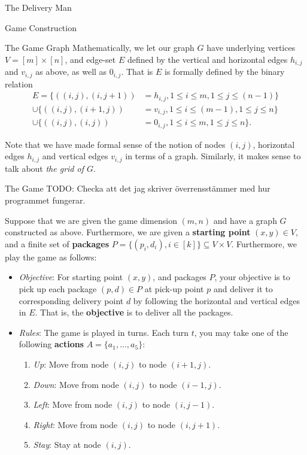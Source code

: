 \begin{section}{The Delivery Man}
\begin{subsection}{Game Construction}
\begin{subsubsection}{The Game Graph}
    Mathematically, we let our graph $G$ have underlying vertices $V = [m] \times [n]$, and edge-set $E$ defined by the vertical and horizontal edges $h_{i,j}$ and $v_{i,j}$ as above, as well as $0_{i,j}$. That is $E$ is formally defined by the binary relation
    \begin{equation}
      \begin{split}
      E = \{((i, j), (i, j+1)) &= h_{i,j}, 1 \leq i \leq m, 1 \leq j \leq (n-1)\}
      \\ \cup \{((i, j), (i+1, j)) &= v_{i,j}, 1 \leq i \leq (m-1), 1 \leq j \leq n \}
      \\ \cup \{((i, j), (i, j)) &= 0_{i,j}, 1 \leq i \leq m, 1 \leq j \leq n \}.
      \end{split}
    \end{equation}

    Note that we have made formal sense of the notion of nodes $(i, j)$, horizontal edges $h_{i,j}$ and vertical edges $v_{i,j}$ in terms of a graph. Similarly, it makes sense to talk about \textit{the grid of $G$}.

    \end{subsubsection}
    
    \begin{subsubsection}{The Game}
      TODO: Checka att det jag skriver överrensstämmer med hur programmet fungerar.

       Suppose that we are given the game dimension $(m, n)$ and have a graph $G$ constructed as above. Furthermore, we are given a \textbf{starting point} $(x, y)\in V$, and a finite set of \textbf{packages} $P = \{(p_i, d_i), i \in [k]\} \subseteq V\times V$. Furthermore, we play the game as follows:
      \begin{itemize}

        \item \textit{Objective}: For starting point $(x,y)$, and packages $P$, your objective is to pick up each package $(p,d)\in P$ at pick-up point $p$ and deliver it to corresponding delivery point $d$ by following the horizontal and vertical edges in $E$. That is, the \textbf{objective} is to deliver all the packages.

        \item \textit{Rules}:
          The game is played in turns. Each turn $t$, you may take one of the following \textbf{actions} $A = \{a_1, ..., a_5 \}$:
          \begin{enumerate}
          \item \textit{Up}: Move from node $(i, j)$ to node $(i+1, j)$.
          \item \textit{Down}: Move from node $(i, j)$ to node $(i-1, j)$.
          \item \textit{Left}: Move from node $(i, j)$ to node $(i, j-1)$.
          \item \textit{Right}: Move from node $(i, j)$ to node $(i, j+1)$.
          \item \textit{Stay}: Stay at node $(i, j)$.
          \end{enumerate}
          

\end{itemize}
\end{subsubsection}
\end{subsection}
\end{section}
